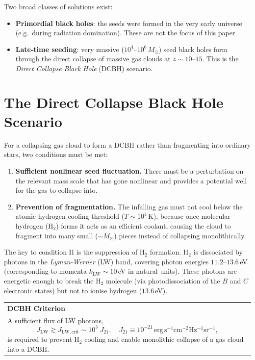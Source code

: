 \documentclass[12pt,a4paper]{report}
\newenvironment{keyresult}[1][Key Result]{%
  \par\medskip\noindent
  \begin{tabular}{|p{\dimexpr\linewidth-2\tabcolsep-2\arrayrulewidth\relax}|}
  \hline
  \textbf{#1}\\[2pt]
}{%
  \\ \hline
  \end{tabular}
  \par\medskip
}
\newcommand{\LW}{\mathrm{LW}}
\theoremstyle{definition}
\begin{document}
Two broad classes of solutions exist:
\begin{itemize}[noitemsep]
  \item \textbf{Primordial black holes}: the seeds were formed in the very early universe
    (e.g.\ during radiation domination). These are not the focus of this paper.
  \item \textbf{Late-time seeding}: very massive ($10^4$--$10^6\,M_\odot$) seed black
    holes form through the direct collapse of massive gas clouds at $z\sim 10$--$15$.
    This is the \emph{Direct Collapse Black Hole} (DCBH) scenario.
\end{itemize}

\section{The Direct Collapse Black Hole Scenario}

For a collapsing gas cloud to form a DCBH rather than fragmenting into ordinary stars,
two conditions must be met:

\begin{enumerate}[label=\Roman*.]
  \item \textbf{Sufficient nonlinear seed fluctuation.} There must be a perturbation
    on the relevant mass scale that has gone nonlinear and provides a potential well
    for the gas to collapse into.
  \item \textbf{Prevention of fragmentation.} The infalling gas must not cool below
    the atomic hydrogen cooling threshold ($T\sim 10^4$\,K), because once molecular
    hydrogen (H$_2$) forms it acts as an efficient coolant, causing the cloud to
    fragment into many small ($\sim M_\odot$) pieces instead of collapsing
    monolithically.
\end{enumerate}

The key to condition II is the suppression of H$_2$ formation. H$_2$ is dissociated
by photons in the \emph{Lyman-Werner} (LW) band, covering photon energies
$11.2$--$13.6$\,eV (corresponding to momenta $k_{\LW}\sim 10$\,eV in natural units).
These photons are energetic enough to break the $\mathrm{H_2}$ molecule (via
photodissociation of the $B$ and $C$ electronic states) but not to ionise hydrogen
($13.6$\,eV).

\begin{keyresult}[DCBH Criterion]
A sufficient flux of LW photons,
\begin{equation}
  J_{\LW} \gtrsim J_{\LW,\mathrm{crit}} \sim 10^3 \; J_{21},
  \quad J_{21} \equiv 10^{-21}\,\mathrm{erg\,s^{-1}cm^{-2}Hz^{-1}sr^{-1}},
\end{equation}
is required to prevent H$_2$ cooling and enable monolithic collapse of a gas cloud
into a DCBH.
\end{keyresult}
\end{document}
